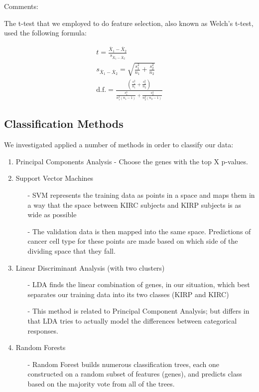 
Comments:

The t-test that we employed to do feature selection, also known as Welch's
t-test, used the following formula:

\begin{gather}
t = \frac{\overline{X}_1-\overline{X}_2}{s_{\overline{X}_1-\overline{X}_2}} \\
s_{\overline{X}_1-\overline{X}_2} = \sqrt{\frac{s_1^2}{n_1}+\frac{s_2^2}{n_2}} \\
\text{d.f.} = \frac{\left(\frac{s_1^2}{n_1}+\frac{s_2^2}{n_2} \right)}{\frac{s_1^4}{n_1^2(n_1-1)} + \frac{s_2^4}{n_2^2(n_2-1)}}
\end{gather}

\subsection{Classification Methods}

We investigated applied a number of methods in order to classify our data:

\begin{enumerate}
\item Principal Components Analysis - Choose the genes with the top X p-values. 
\item Support Vector Machines
\begin{itemize}
\item[-] SVM represents the training data as points in a space and maps them in a way
that the space between KIRC subjects and KIRP subjects is as wide as possible
\item[-] The validation data is then mapped into the same space. Predictions of cancer
cell type for these points are made based on which side of the dividing space that they fall. 
\end{itemize}
\item Linear Discriminant Analysis (with two clusters)
\begin{itemize}
\item[-] LDA finds the linear combination of genes, in our situation, which best separates our
training data into its two classes (KIRP and KIRC)
\item[-] This method is related to Principal Component Analysis; but differs in that LDA tries to
actually model the differences between categorical responses.
\end{itemize}
\item Random Forests
\begin{itemize}
\item[-] Random Forest builds numerous classification trees, each one constructed on a random subset of
features (genes), and predicts class based on the majority vote from all of the trees.
\end{itemize}
\end{enumerate}

